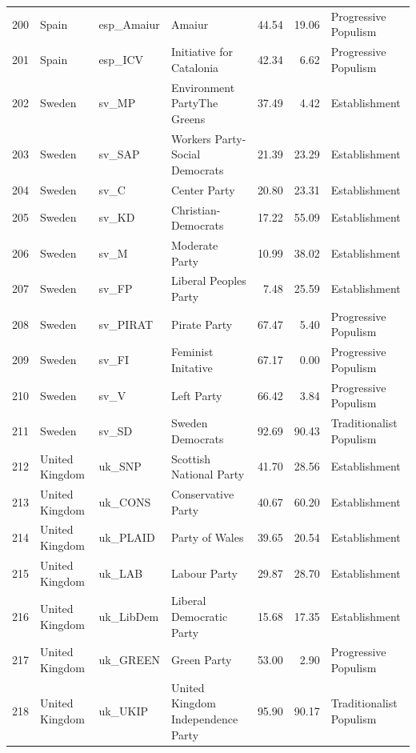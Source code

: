 \begin{landscape}
\begin{longtable}[c]{@{\extracolsep{\fill}}rlllrrl}
  200 & Spain & esp\_Amaiur & Amaiur & 44.54 & 19.06 & Progressive Populism \\ 
  201 & Spain & esp\_ICV & Initiative for Catalonia & 42.34 & 6.62 & Progressive Populism \\ 
  202 & Sweden & sv\_MP & Environment PartyThe Greens & 37.49 & 4.42 & Establishment \\ 
  203 & Sweden & sv\_SAP & Workers Party-Social Democrats & 21.39 & 23.29 & Establishment \\ 
  204 & Sweden & sv\_C & Center Party & 20.80 & 23.31 & Establishment \\ 
  205 & Sweden & sv\_KD & Christian-Democrats & 17.22 & 55.09 & Establishment \\ 
  206 & Sweden & sv\_M & Moderate Party & 10.99 & 38.02 & Establishment \\ 
  207 & Sweden & sv\_FP & Liberal Peoples Party & 7.48 & 25.59 & Establishment \\ 
  208 & Sweden & sv\_PIRAT & Pirate Party & 67.47 & 5.40 & Progressive Populism \\ 
  209 & Sweden & sv\_FI & Feminist Initative & 67.17 & 0.00 & Progressive Populism \\ 
  210 & Sweden & sv\_V & Left Party & 66.42 & 3.84 & Progressive Populism \\ 
  211 & Sweden & sv\_SD & Sweden Democrats & 92.69 & 90.43 & Traditionalist Populism \\ 
  212 & United Kingdom & uk\_SNP & Scottish National Party & 41.70 & 28.56 & Establishment \\ 
  213 & United Kingdom & uk\_CONS & Conservative Party & 40.67 & 60.20 & Establishment \\ 
  214 & United Kingdom & uk\_PLAID & Party of Wales & 39.65 & 20.54 & Establishment \\ 
  215 & United Kingdom & uk\_LAB & Labour Party & 29.87 & 28.70 & Establishment \\ 
  216 & United Kingdom & uk\_LibDem & Liberal Democratic Party & 15.68 & 17.35 & Establishment \\ 
  217 & United Kingdom & uk\_GREEN & Green Party & 53.00 & 2.90 & Progressive Populism \\ 
  218 & United Kingdom & uk\_UKIP & United Kingdom Independence Party & 95.90 & 90.17 & Traditionalist Populism \\ \hline
\end{longtable}
\end{landscape}



